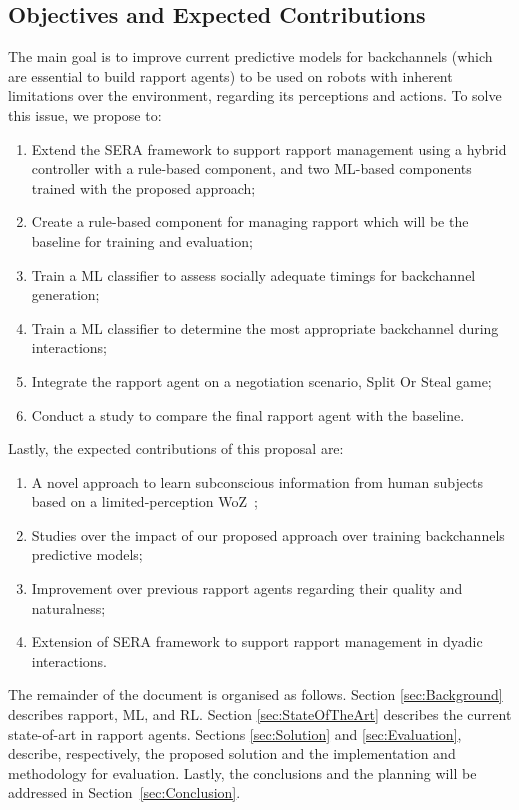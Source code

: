 \subsection{Objectives and Expected Contributions}
\label{subsec:Objectives}

The main goal is to improve current predictive models for backchannels (which are essential to build rapport agents) to be used on robots with inherent limitations over the environment, regarding its perceptions and actions. To solve this issue, we propose to:

\begin{enumerate}[label=(\roman*)]
	\item Extend the \ac{SERA} framework to support rapport management using a hybrid controller with a rule-based component, and two \ac{ML}-based components trained with the proposed approach;
	\item Create a rule-based component for managing rapport which will be the baseline for training and evaluation;
	\item Train a \ac{ML} classifier to assess socially adequate timings for backchannel generation;
	\item Train a \ac{ML} classifier to determine the most appropriate backchannel during interactions;
	\item Integrate the rapport agent on a negotiation scenario, Split Or Steal game;
	\item Conduct a study to compare the final rapport agent with the baseline.
\end{enumerate}

Lastly, the expected contributions of this proposal are:
\begin{enumerate}[label=(\roman*)]
	\item A novel approach to learn subconscious information from human subjects based on a limited-perception \ac{WoZ}~\cite{Sequeira2016};
	\item Studies over the impact of our proposed approach over training backchannels predictive models;
	\item Improvement over previous rapport agents regarding their quality and naturalness;
	\item Extension of \ac{SERA} framework to support rapport management in dyadic interactions.
\end{enumerate}

The remainder of the document is organised as follows. Section \ref{sec:Background} describes rapport, \acl{ML}, and \acl{RL}. Section \ref{sec:StateOfTheArt} describes the current state-of-art in rapport agents. Sections \ref{sec:Solution} and \ref{sec:Evaluation}, describe, respectively, the proposed solution and the implementation and methodology for evaluation. Lastly, the conclusions and the planning will be addressed in Section~\ref{sec:Conclusion}.